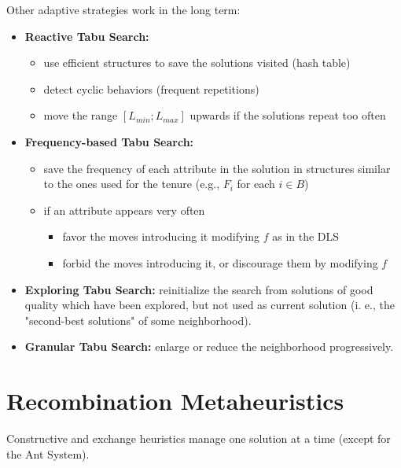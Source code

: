 \documentclass[11pt]{article}
\begin{document}
	Other adaptive strategies work in the long term:
	\begin{itemize}
		\item \textbf{Reactive Tabu Search:}
		\begin{itemize}
			\item use efficient structures to save the solutions visited (hash table)
			\item detect cyclic behaviors (frequent repetitions)
			\item move the range $[L_{min}; L_{max}]$ upwards if the solutions repeat too often
		\end{itemize}
		\nn
		
		\item \textbf{Frequency-based Tabu Search:}
		\begin{itemize}
			\item save the frequency of each attribute in the solution in structures similar to the ones used for the tenure (e.g., $F_i$ for each $i \in B$)
			\item if an attribute appears very often
			\begin{itemize}
				\item favor the moves introducing it modifying $f$ as in the DLS
				\item forbid the moves introducing it, or discourage them by modifying $f$
			\end{itemize}
		\end{itemize}
		\nn
		
		\item \textbf{Exploring Tabu Search:} reinitialize the search from solutions of good quality which have been explored, but not used as current solution (i. e., the "second-best solutions" of some neighborhood).\\
		
		\item \textbf{Granular Tabu Search:} enlarge or reduce the neighborhood progressively.\\
	\end{itemize}
	
	
	\newpage
	
	\section{Recombination Metaheuristics}
	
	Constructive and exchange heuristics manage one solution at a time (except for the Ant System).\\
	
\end{document}
